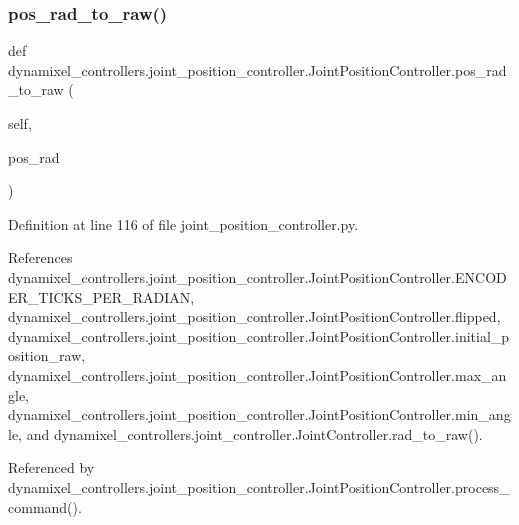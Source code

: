 \subsubsection{\texorpdfstring{pos\+\_\+rad\+\_\+to\+\_\+raw()}{pos\_rad\_to\_raw()}}
{\footnotesize\ttfamily def dynamixel\+\_\+controllers.\+joint\+\_\+position\+\_\+controller.\+Joint\+Position\+Controller.\+pos\+\_\+rad\+\_\+to\+\_\+raw (\begin{DoxyParamCaption}\item[{}]{self,  }\item[{}]{pos\+\_\+rad }\end{DoxyParamCaption})}



Definition at line 116 of file joint\+\_\+position\+\_\+controller.\+py.



References dynamixel\+\_\+controllers.\+joint\+\_\+position\+\_\+controller.\+Joint\+Position\+Controller.\+E\+N\+C\+O\+D\+E\+R\+\_\+\+T\+I\+C\+K\+S\+\_\+\+P\+E\+R\+\_\+\+R\+A\+D\+I\+AN, dynamixel\+\_\+controllers.\+joint\+\_\+position\+\_\+controller.\+Joint\+Position\+Controller.\+flipped, dynamixel\+\_\+controllers.\+joint\+\_\+position\+\_\+controller.\+Joint\+Position\+Controller.\+initial\+\_\+position\+\_\+raw, dynamixel\+\_\+controllers.\+joint\+\_\+position\+\_\+controller.\+Joint\+Position\+Controller.\+max\+\_\+angle, dynamixel\+\_\+controllers.\+joint\+\_\+position\+\_\+controller.\+Joint\+Position\+Controller.\+min\+\_\+angle, and dynamixel\+\_\+controllers.\+joint\+\_\+controller.\+Joint\+Controller.\+rad\+\_\+to\+\_\+raw().



Referenced by dynamixel\+\_\+controllers.\+joint\+\_\+position\+\_\+controller.\+Joint\+Position\+Controller.\+process\+\_\+command().


